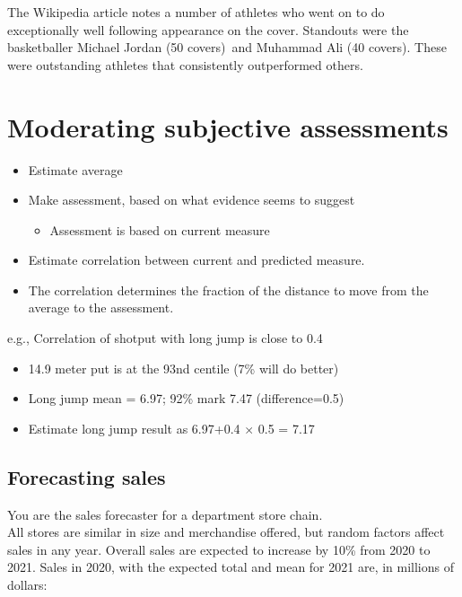 \documentclass[
  10pt,
  b5paper]{book}
\providecommand{\tightlist}{%
  \setlength{\itemsep}{0pt}\setlength{\parskip}{0pt}}
\begin{document}
The Wikipedia article notes a number of athletes who went on to do
exceptionally well following appearance on the cover. Standouts
were the basketballer Michael Jordan (50 covers)~and Muhammad Ali
(40 covers). These were outstanding athletes that consistently
outperformed others.

\hypertarget{moderating-subjective-assessments}{%
\section{Moderating subjective assessments}\label{moderating-subjective-assessments}}

\begin{itemize}
\tightlist
\item
  Estimate average
\item
  Make assessment, based on what evidence seems to suggest

  \begin{itemize}
  \tightlist
  \item
    Assessment is based on current measure
  \end{itemize}
\item
  Estimate correlation between current and predicted measure.
\item
  The correlation determines the fraction of the distance
  to move from the average to the assessment.
\end{itemize}

e.g., Correlation of shotput with long jump is close to 0.4

\begin{itemize}
\tightlist
\item
  14.9 meter put is at the 93nd centile (7\% will do better)
\item
  Long jump mean = 6.97; 92\% mark 7.47 (difference=0.5)
\item
  Estimate long jump result as 6.97+0.4 \(\times\) 0.5 = 7.17
\end{itemize}

\hypertarget{forecasting-sales}{%
\subsection*{Forecasting sales}\label{forecasting-sales}}

You are the sales forecaster for a department store chain.\\
All stores are similar in size and merchandise offered,
but random factors affect sales in any year. Overall sales
are expected to increase by 10\% from 2020 to 2021. Sales
in 2020, with the expected total and mean for 2021 are,
in millions of dollars:
\end{document}
